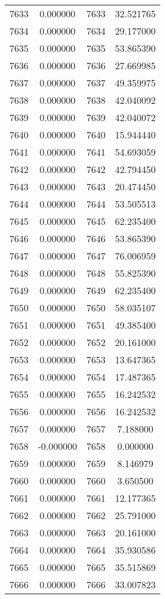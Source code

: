 \documentclass[12pt]{article}
\begin{document}
\begin{longtable}{@{}cccc@{}}
7633 & 0.000000 & 7633 & 32.521765 \\
7634 & 0.000000 & 7634 & 29.177000 \\
7635 & 0.000000 & 7635 & 53.865390 \\
7636 & 0.000000 & 7636 & 27.669985 \\
7637 & 0.000000 & 7637 & 49.359975 \\
7638 & 0.000000 & 7638 & 42.040092 \\
7639 & 0.000000 & 7639 & 42.040072 \\
7640 & 0.000000 & 7640 & 15.944440 \\
7641 & 0.000000 & 7641 & 54.693059 \\
7642 & 0.000000 & 7642 & 42.794450 \\
7643 & 0.000000 & 7643 & 20.474450 \\
7644 & 0.000000 & 7644 & 53.505513 \\
7645 & 0.000000 & 7645 & 62.235400 \\
7646 & 0.000000 & 7646 & 53.865390 \\
7647 & 0.000000 & 7647 & 76.006959 \\
7648 & 0.000000 & 7648 & 55.825390 \\
7649 & 0.000000 & 7649 & 62.235400 \\
7650 & 0.000000 & 7650 & 58.035107 \\
7651 & 0.000000 & 7651 & 49.385400 \\
7652 & 0.000000 & 7652 & 20.161000 \\
7653 & 0.000000 & 7653 & 13.647365 \\
7654 & 0.000000 & 7654 & 17.487365 \\
7655 & 0.000000 & 7655 & 16.242532 \\
7656 & 0.000000 & 7656 & 16.242532 \\
7657 & 0.000000 & 7657 & 7.188000 \\
7658 & -0.000000 & 7658 & 0.000000 \\
7659 & 0.000000 & 7659 & 8.146979 \\
7660 & 0.000000 & 7660 & 3.650500 \\
7661 & 0.000000 & 7661 & 12.177365 \\
7662 & 0.000000 & 7662 & 25.791000 \\
7663 & 0.000000 & 7663 & 20.161000 \\
7664 & 0.000000 & 7664 & 35.930586 \\
7665 & 0.000000 & 7665 & 35.515869 \\
7666 & 0.000000 & 7666 & 33.007823 \\

\end{longtable}
\end{document}

